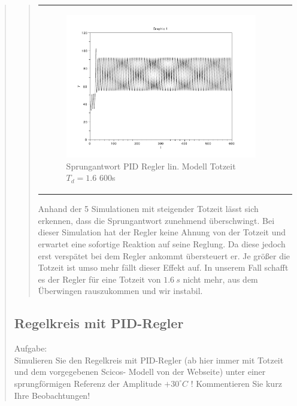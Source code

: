 \begin{quote}
\begin{quote}
\begin{center}
\begin{tabular}{ll}
                    \begin{minipage}{0.6\textwidth}
                        \begin{figure}[H]
                            \includegraphics[scale=0.4,trim = 0cm 0cm 0cm
                            0cm, clip]
                            {./Bilder/4_1_Td_16_600s}
                              \caption{Sprungantwort PID Regler lin. Modell Totzeit $T_d = 1.6$ 600s}
                        \end{figure}
                    \end{minipage}
                
                \end{tabular}
            \end{center}
    
        Anhand der 5 Simulationen mit steigender Totzeit lässt sich erkennen, dass die Sprungantwort zunehmend
        überschwingt. Bei dieser Simulation hat der Regler keine Ahnung von der Totzeit und erwartet eine sofortige
        Reaktion auf seine Reglung. Da diese jedoch erst verspätet bei dem Regler ankommt übersteuert er. Je größer die
        Totzeit ist umso mehr fällt dieser Effekt auf. In unserem Fall schafft es der Regler für eine Totzeit von $1.6
        \ s$ nicht mehr, aus dem Überwingen rauszukommen und wir instabil.
    

    \end{quote}
    
    \subsection{Regelkreis mit PID-Regler}
    Aufgabe:\\
    Simulieren Sie den Regelkreis mit PID-Regler (ab hier immer mit Totzeit und dem vorgegebenen Scicos- Modell von der
    Webseite) unter einer sprungförmigen Referenz der Amplitude $+30^{\circ}C$ ! Kommentieren Sie kurz Ihre
    Beobachtungen!\vspace{1em}
    

\end{quote}
